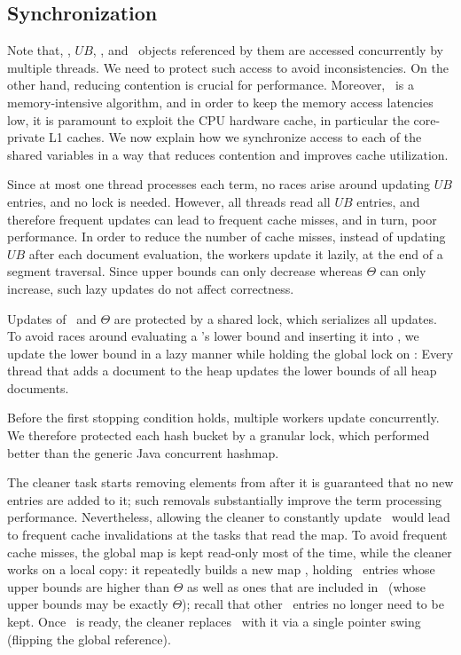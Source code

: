 \subsection{Synchronization} 
\label{sec:synch}

Note that, \DHeap, $UB$, \DMap, and \Docobj\ objects referenced by them are accessed concurrently by multiple threads. We need to protect such access to avoid inconsistencies. On the other hand, reducing contention is crucial for performance. Moreover, 
\alg\ is a memory-intensive algorithm, and 
in order to keep the memory access latencies low, it is paramount to exploit the CPU hardware cache, in particular the core-private L1 caches. 
We now explain how we synchronize access to each of the shared variables
in a way that reduces contention and improves cache utilization. 



Since at most one thread processes each term, no races arise around updating $UB$ entries, and no lock is needed. However, 
all threads read all $UB$ entries, and therefore frequent updates can lead to frequent cache misses, and in turn, poor performance. 
In order to reduce the number of cache misses, instead of updating $UB$ after each document evaluation, the workers update it lazily, at the end of a segment traversal. Since upper bounds can only decrease whereas $\Theta$ can only increase, such lazy updates do not affect correctness.

Updates of \DHeap\ and $\Theta$ are protected by a shared lock, which  serializes all updates. 
To avoid races around evaluating a \Docobj's
lower bound and inserting it into \DHeap, we update the lower bound in a lazy manner while holding the global lock on \DHeap: Every thread that adds a document to the heap updates the lower bounds of all heap documents.

Before the first stopping condition holds, multiple workers update \DMap\/ concurrently. 
We therefore protected each hash bucket by a granular lock, which  
performed better than the generic Java concurrent hashmap.

The cleaner task starts removing elements from  \DMap\/ after it is guaranteed that 
no new entries are added to  it; such removals substantially improve the term processing performance. 
Nevertheless, allowing the cleaner to constantly update \DMap\ would lead to frequent cache invalidations at the
tasks that read the map. 
To avoid frequent cache misses, 
the global map is kept read-only most of the time, while the cleaner works on a local copy: 
it  
repeatedly builds a new map \LDMap, holding \DMap\ entries whose upper bounds 
are higher than $\Theta$ as well as ones that are included in \DHeap\ (whose upper bounds may be exactly $\Theta$); recall that other \DMap\ entries no longer need to be kept. 
Once \LDMap\ is ready, the cleaner replaces \DMap\ with it via a single pointer swing 
(flipping the global reference). 

